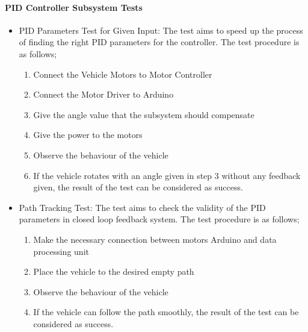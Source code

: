 \documentclass[a4paper,12pt]{article}
\begin{document}
	\paragraph{PID Controller Subsystem Tests}	
	\begin{itemize}
		\item PID Parameters Test for Given Input:
			The test aims to speed up the process of finding the right PID parameters for the controller. The test procedure is as follows; 		
			\begin{enumerate}
				\item Connect the Vehicle Motors to Motor Controller \vspace{-0.2cm}
				\item Connect the Motor Driver to Arduino \vspace{-0.2cm}
				\item Give the angle value that the subsystem should compensate  \vspace{-0.2cm}
				\item Give the power to the motors \vspace{-0.2cm}
				\item Observe the behaviour of the vehicle \vspace{-0.2cm}
				\item If the vehicle rotates with an angle given in step 3 without any feedback given, the result of the test can be considered as success. \vspace{-0.2cm}
			\end{enumerate}
				
		
		\item Path Tracking Test:
			The test aims to check the validity of the PID parameters in closed loop feedback system. The test procedure is as follows; 		
			\begin{enumerate}
				\item Make the necessary connection between motors Arduino and data processing unit \vspace{-0.2cm}
				\item Place the vehicle to the desired empty path  \vspace{-0.2cm}
				\item Observe the behaviour of the vehicle \vspace{-0.2cm}
				\item If the vehicle can follow the path smoothly, the result of the test can be considered as success. \vspace{-0.2cm}
			\end{enumerate}
				

\end{itemize}
\end{document}
